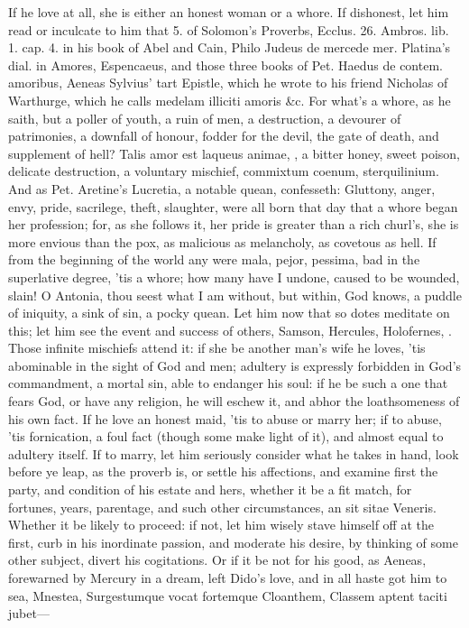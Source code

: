 If he love at all, she is either an honest woman or a whore. If
dishonest, let him read or inculcate to him that 5. of Solomon's
Proverbs, Ecclus. 26. Ambros. lib. 1. cap. 4. in his book of Abel and
Cain, Philo Judeus de mercede mer. Platina's dial. in Amores,
Espencaeus, and those three books of Pet. Haedus de contem. amoribus,
Aeneas Sylvius' tart Epistle, which he wrote to his friend Nicholas of
Warthurge, which he calls medelam illiciti amoris \&c. For what's
a whore, as he saith, but a poller of youth, a ruin of men, a
destruction, a devourer of patrimonies, a downfall of honour, fodder
for the devil, the gate of death, and supplement of hell? Talis
amor est laqueus animae, \etc{}, a bitter honey, sweet poison, delicate
destruction, a voluntary mischief, commixtum coenum, sterquilinium. And
as Pet. Aretine's Lucretia, a notable quean, confesseth:
Gluttony, anger, envy, pride, sacrilege, theft, slaughter, were all
born that day that a whore began her profession; for, as she follows
it, her pride is greater than a rich churl's, she is more envious than
the pox, as malicious as melancholy, as covetous as hell. If from the
beginning of the world any were mala, pejor, pessima, bad in the
superlative degree, 'tis a whore; how many have I undone, caused to be
wounded, slain! O Antonia, thou seest what I am without, but
within, God knows, a puddle of iniquity, a sink of sin, a pocky quean.
Let him now that so dotes meditate on this; let him see the event and
success of others, Samson, Hercules, Holofernes, \etc{}. Those infinite
mischiefs attend it: if she be another man's wife he loves, 'tis
abominable in the sight of God and men; adultery is expressly forbidden
in God's commandment, a mortal sin, able to endanger his soul: if he be
such a one that fears God, or have any religion, he will eschew it, and
abhor the loathsomeness of his own fact. If he love an honest maid,
'tis to abuse or marry her; if to abuse, 'tis fornication, a foul fact
(though some make light of it), and almost equal to adultery itself. If
to marry, let him seriously consider what he takes in hand, look before
ye leap, as the proverb is, or settle his affections, and examine first
the party, and condition of his estate and hers, whether it be a fit
match, for fortunes, years, parentage, and such other circumstances, an
sit sitae Veneris. Whether it be likely to proceed: if not, let him
wisely stave himself off at the first, curb in his inordinate passion,
and moderate his desire, by thinking of some other subject, divert his
cogitations. Or if it be not for his good, as Aeneas, forewarned by
Mercury in a dream, left Dido's love, and in all haste got him to sea,
Mnestea, Surgestumque vocat fortemque Cloanthem,
Classem aptent taciti jubet---

